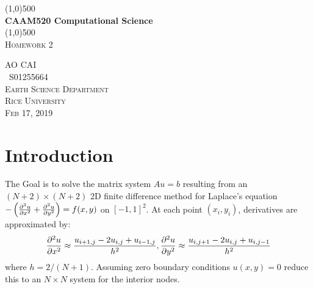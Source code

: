 \documentclass[12pt]{article}
\begin{document}

\begin{titlepage}
	\begin{center}
	\line(1,0){500}\\
	[0.25in]
	\huge{\bfseries CAAM520 Computational Science}\\
	[2mm]
	\line(1,0){500}\\
	[1.5cm]
	\textsc{\LARGE Homework 2}\\
	[8cm] 
	\end{center}
	\begin{flushright}
	\textsc{\large AO CAI \\
	\ S01255664\\
	Earth Science Department\\
	Rice University\\
	Feb 17, 2019\\}
	\end{flushright}

\end{titlepage}


\tableofcontents
\thispagestyle{empty}
\cleardoublepage

\setcounter{page}{1}

\section{Introduction}\label{sec:intro}
The Goal is to solve the matrix system {\bfseries$Au=b$} resulting from an $(N+2)\times(N+2)$ 2D finite difference method for Laplace's equation $-\left(\pdv[2]{u}{x} + \pdv[2]{u}{y} \right) = f(x,y)$ on $[-1,1]^2$. At each point $(x_i,y_i)$, derivatives are approximated by:
$$\pdv[2]{u}{x} \approx \frac{u_{i+1,j}-2u_{i,j}+u_{i-1,j}}{h^2}, \pdv[2]{u}{y} \approx \frac{u_{i,j+1}-2u_{i,j}+u_{i,j-1}}{h^2}$$
where $h = 2/(N+1)$. Assuming zero boundary conditions $u(x,y) = 0$ reduce this to an $N \times N$ system for the interior nodes.
\end{document}
